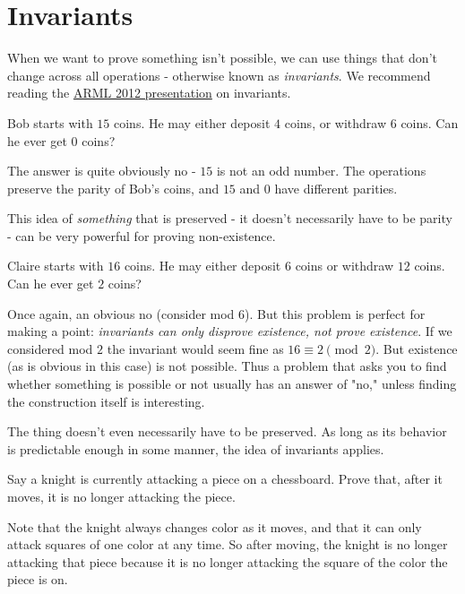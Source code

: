 \documentclass[blue,onecol]{shooting}
\begin{document}
\section{Invariants}
When we want to prove something isn't possible, we can use things that don't change across all operations - otherwise known as \textit{invariants}. We recommend reading the \href{https://www.math.cmu.edu/~mlavrov/arml/12-13/invariants-12-09-12.pdf}{ARML 2012 presentation} on invariants.

\begin{exam}[Parity]
Bob starts with $15$ coins. He may either deposit $4$ coins, or withdraw $6$ coins. Can he ever get $0$ coins?
\end{exam}

\begin{sol}The answer is quite obviously no - $15$ is not an odd number. The operations preserve the parity of Bob's coins, and $15$ and $0$ have different parities.\end{sol}

This idea of \textit{something} that is preserved - it doesn't necessarily have to be parity - can be very powerful for proving non-existence.

\begin{exam}
Claire starts with $16$ coins. He may either deposit $6$ coins or withdraw $12$ coins. Can he ever get $2$ coins?
\end{exam}

Once again, an obvious no (consider mod $6$). But this problem is perfect for making a point: \textit{invariants can only disprove existence, not prove existence}. If we considered mod $2$ the invariant would seem fine as $16\equiv 2\pmod {2}.$ But existence (as is obvious in this case) is not possible. Thus a problem that asks you to find whether something is possible or not usually has an answer of "no," unless finding the construction itself is interesting.

The thing doesn't even necessarily have to be preserved. As long as its behavior is predictable enough in some manner, the idea of invariants applies.

\begin{exam}
Say a knight is currently attacking a piece on a chessboard. Prove that, after it moves, it is no longer attacking the piece.
\end{exam}

\begin{sol}
Note that the knight always changes color as it moves, and that it can only attack squares of one color at any time. So after moving, the knight is no longer attacking that piece because it is no longer attacking the square of the color the piece is on.
\end{sol}
\end{document}

